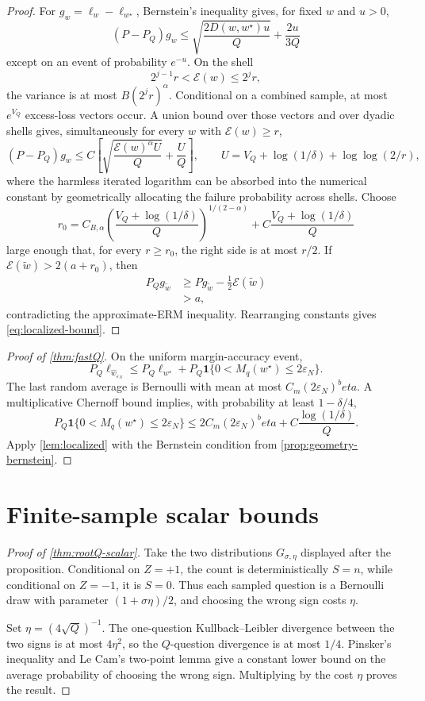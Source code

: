 \documentclass[11pt]{article}
\def\beta{beta}%
\newcommand{\one}{\mathbf 1}
\newcommand{\eps}{\varepsilon}
\begin{document}
\begin{proof}
For $g_w=\ell_w-\ell_{w^\star}$, Bernstein's inequality gives, for fixed $w$ and $u>0$,
\[
(P-P_Q)g_w
\le
\sqrt{\frac{2D(w,w^\star)u}{Q}}
+
\frac{2u}{3Q}
\]
except on an event of probability $e^{-u}$.  On the shell
\[
2^{j-1}r<\mathcal E(w)\le2^jr,
\]
the variance is at most $B(2^jr)^\alpha$.  Conditional on a combined sample, at most $e^{V_Q}$ excess-loss vectors occur.  A union bound over those vectors and over dyadic shells gives, simultaneously for every $w$ with $\mathcal E(w)\ge r$,
\[
(P-P_Q)g_w
\le
C\left[
\sqrt{\frac{\mathcal E(w)^\alpha U}{Q}}
+
\frac{U}{Q}
\right],
\qquad
U=V_Q+\log(1/\delta)+\log\log(2/r),
\]
where the harmless iterated logarithm can be absorbed into the numerical constant by geometrically allocating the failure probability across shells.  Choose
\[
r_0=C_{B,\alpha}
\left(\frac{V_Q+\log(1/\delta)}{Q}\right)^{1/(2-\alpha)}
+C\frac{V_Q+\log(1/\delta)}{Q}
\]
large enough that, for every $r\ge r_0$, the right side is at most $r/2$.  If $\mathcal E(\widetilde w)>2(a+r_0)$, then
\begin{align*}
P_Qg_{\widetilde w}
&\ge
Pg_{\widetilde w}-\frac12\mathcal E(\widetilde w)\\
&>
a,
\end{align*}
contradicting the approximate-ERM inequality.  Rearranging constants gives \eqref{eq:localized-bound}.
\end{proof}

\begin{proof}[Proof of \cref{thm:fastQ}]
On the uniform margin-accuracy event,
\[
P_Q\ell_{\widehat w_{\eps_N}}
\le
P_Q\ell_{w^\star}
+P_Q\one\{0<M_q(w^\star)\le2\eps_N\}.
\]
The last random average is Bernoulli with mean at most $C_m(2\eps_N)^\beta$.  A multiplicative Chernoff bound implies, with probability at least $1-\delta/4$,
\[
P_Q\one\{0<M_q(w^\star)\le2\eps_N\}
\le
2C_m(2\eps_N)^\beta
+C\frac{\log(1/\delta)}{Q}.
\]
Apply \cref{lem:localized} with the Bernstein condition from \cref{prop:geometry-bernstein}.
\end{proof}

\section{Finite-sample scalar bounds}
\label{app:finite-lower}

\begin{proof}[Proof of \cref{thm:rootQ-scalar}]
Take the two distributions $G_{\sigma,\eta}$ displayed after the proposition.  Conditional on $Z=+1$, the count is deterministically $S=n$, while conditional on $Z=-1$, it is $S=0$.  Thus each sampled question is a Bernoulli draw with parameter $(1+\sigma\eta)/2$, and choosing the wrong sign costs $\eta$.

Set $\eta=(4\sqrt Q)^{-1}$.  The one-question Kullback--Leibler divergence between the two signs is at most $4\eta^2$, so the $Q$-question divergence is at most $1/4$.  Pinsker's inequality and Le Cam's two-point lemma give a constant lower bound on the average probability of choosing the wrong sign.  Multiplying by the cost $\eta$ proves the result.
\end{proof}
\end{document}
